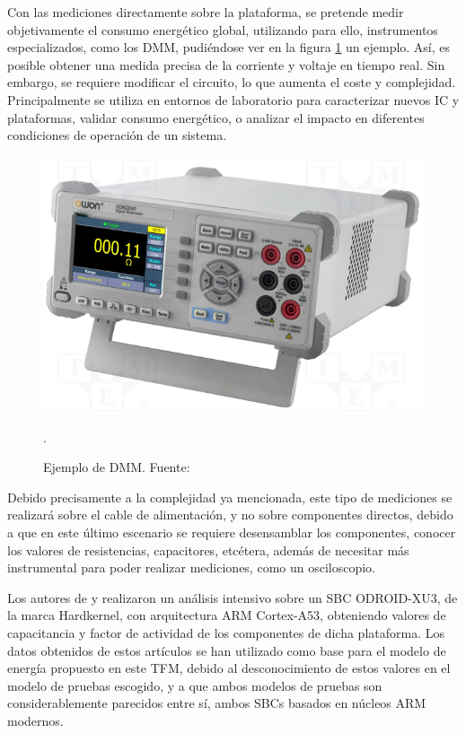 Con las mediciones directamente sobre la plataforma, se pretende medir objetivamente el consumo energético global, utilizando para ello, instrumentos especializados, como los \ac{DMM}, pudiéndose ver en la figura \ref{fig:DMM-malo} un ejemplo. Así, es posible obtener una medida precisa de la corriente y voltaje en tiempo real. Sin embargo, se requiere modificar el circuito, lo que aumenta el coste y complejidad. Principalmente se utiliza en entornos de laboratorio para caracterizar nuevos \ac{IC} y plataformas, validar consumo energético, o analizar el impacto en diferentes condiciones de operación de un sistema. 

\begin{figure}[ht!]
    \centering
    \includegraphics[width=0.4\linewidth, height=0.3\textwidth]{figs/dmm.png}
    \caption{Ejemplo de DMM. Fuente: \cite{DMM}}
    \label{fig:DMM-malo}.
\end{figure}

Debido precisamente a la complejidad ya mencionada, este tipo de mediciones se realizará sobre el cable de alimentación, y no sobre componentes directos, debido a que en este último escenario se requiere desensamblar los componentes, conocer los valores de resistencias, capacitores, etcétera, además de necesitar más instrumental para poder realizar mediciones, como un osciloscopio. 

Los autores de \cite{soton393728} y \cite{soton418538} realizaron un análisis intensivo sobre un \ac{SBC} ODROID-XU3, de la marca Hardkernel, con arquitectura \ac{ARM} Cortex-A53, obteniendo valores de capacitancia y factor de actividad de los componentes de dicha plataforma. Los datos obtenidos de estos artículos se han utilizado como base para el modelo de energía propuesto en este \ac{TFM}, debido al desconocimiento de estos valores en el modelo de pruebas escogido, y a que ambos modelos de pruebas son considerablemente parecidos entre sí, ambos \ac{SBC}s basados en núcleos \ac{ARM} modernos.


